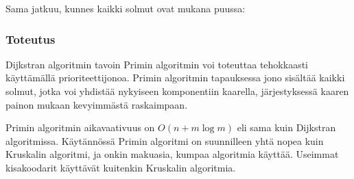 \begin{samepage}
Sama jatkuu, kunnes kaikki solmut ovat mukana puussa:
\begin{center}
\end{center}
\end{samepage}

\subsubsection{Toteutus}

Dijkstran algoritmin tavoin Primin algoritmin voi toteuttaa
tehokkaasti käyttämällä prioriteettijonoa.
Primin algoritmin tapauksessa jono sisältää kaikki solmut,
jotka voi yhdistää nykyiseen komponentiin kaarella,
järjestyksessä kaaren painon mukaan kevyimmästä raskaimpaan.

Primin algoritmin aikavaativuus on $O(n + m \log m)$
eli sama kuin Dijkstran algoritmissa.
Käytännössä Primin algoritmi on suunnilleen
yhtä nopea kuin Kruskalin algoritmi,
ja onkin makuasia, kumpaa algoritmia käyttää.
Useimmat kisakoodarit käyttävät kuitenkin Kruskalin algoritmia.



